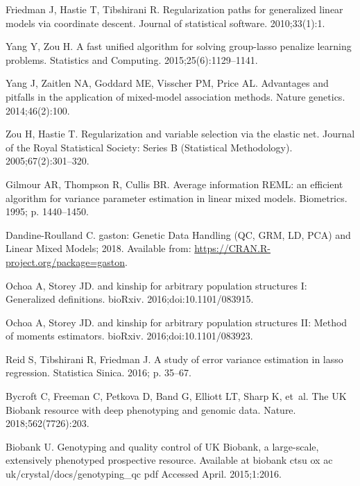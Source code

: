 \documentclass[10pt,letterpaper]{article}
\begin{document}
\begin{thebibliography}{10}
	Friedman J, Hastie T, Tibshirani R.
	\newblock Regularization paths for generalized linear models via coordinate
	descent.
	\newblock Journal of statistical software. 2010;33(1):1.
	
	Yang Y, Zou H.
	\newblock A fast unified algorithm for solving group-lasso penalize learning
	problems.
	\newblock Statistics and Computing. 2015;25(6):1129--1141.
	
	Yang J, Zaitlen NA, Goddard ME, Visscher PM, Price AL.
	\newblock Advantages and pitfalls in the application of mixed-model association
	methods.
	\newblock Nature genetics. 2014;46(2):100.
	
	Zou H, Hastie T.
	\newblock Regularization and variable selection via the elastic net.
	\newblock Journal of the Royal Statistical Society: Series B (Statistical
	Methodology). 2005;67(2):301--320.
	
	Gilmour AR, Thompson R, Cullis BR.
	\newblock Average information REML: an efficient algorithm for variance
	parameter estimation in linear mixed models.
	\newblock Biometrics. 1995; p. 1440--1450.
	
	Dandine-Roulland C. gaston: Genetic Data Handling (QC, GRM, LD, PCA) and Linear
	Mixed Models; 2018.
	\newblock Available from: \url{https://CRAN.R-project.org/package=gaston}.
	
	Ochoa A, Storey JD.
	 and kinship for arbitrary population structures {I}:
	Generalized definitions.
	\newblock bioRxiv. 2016;doi:{10.1101/083915}.
	
	Ochoa A, Storey JD.
	 and kinship for arbitrary population structures {II}: Method of
	moments estimators.
	\newblock bioRxiv. 2016;doi:{10.1101/083923}.
	
	Reid S, Tibshirani R, Friedman J.
	\newblock A study of error variance estimation in lasso regression.
	\newblock Statistica Sinica. 2016; p. 35--67.
	
	Bycroft C, Freeman C, Petkova D, Band G, Elliott LT, Sharp K, et~al.
	\newblock The UK Biobank resource with deep phenotyping and genomic data.
	\newblock Nature. 2018;562(7726):203.
	
	Biobank U.
	\newblock Genotyping and quality control of UK Biobank, a large-scale,
	extensively phenotyped prospective resource.
	\newblock Available at biobank ctsu ox ac uk/crystal/docs/genotyping\_qc pdf
	Accessed April. 2015;1:2016.
	

\end{thebibliography}
\end{document}
